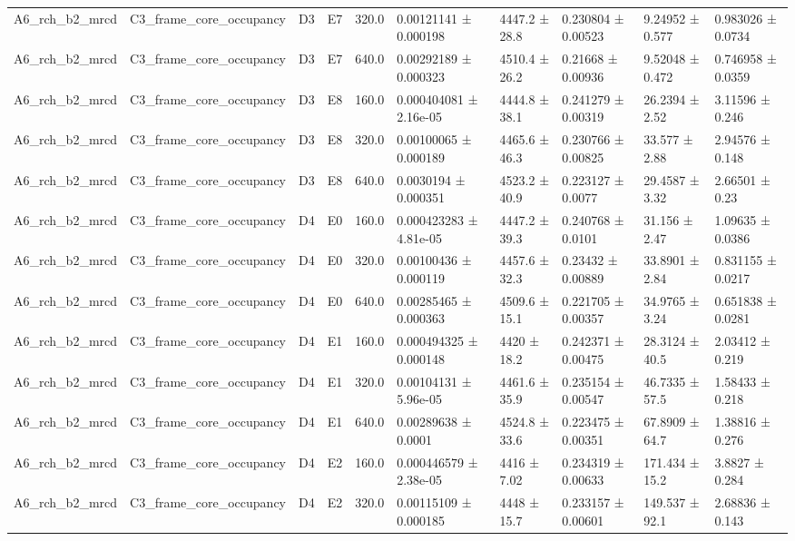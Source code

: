 \begin{table}
\begin{tabular}{llllllllll}
A6\_rch\_b2\_mrcd & C3\_frame\_core\_occupancy & D3 & E7 & 320.0 & 0.00121141 ± 0.000198 & 4447.2 ± 28.8 & 0.230804 ± 0.00523 & 9.24952 ± 0.577 & 0.983026 ± 0.0734 \\
A6\_rch\_b2\_mrcd & C3\_frame\_core\_occupancy & D3 & E7 & 640.0 & 0.00292189 ± 0.000323 & 4510.4 ± 26.2 & 0.21668 ± 0.00936 & 9.52048 ± 0.472 & 0.746958 ± 0.0359 \\
A6\_rch\_b2\_mrcd & C3\_frame\_core\_occupancy & D3 & E8 & 160.0 & 0.000404081 ± 2.16e-05 & 4444.8 ± 38.1 & 0.241279 ± 0.00319 & 26.2394 ± 2.52 & 3.11596 ± 0.246 \\
A6\_rch\_b2\_mrcd & C3\_frame\_core\_occupancy & D3 & E8 & 320.0 & 0.00100065 ± 0.000189 & 4465.6 ± 46.3 & 0.230766 ± 0.00825 & 33.577 ± 2.88 & 2.94576 ± 0.148 \\
A6\_rch\_b2\_mrcd & C3\_frame\_core\_occupancy & D3 & E8 & 640.0 & 0.0030194 ± 0.000351 & 4523.2 ± 40.9 & 0.223127 ± 0.0077 & 29.4587 ± 3.32 & 2.66501 ± 0.23 \\
A6\_rch\_b2\_mrcd & C3\_frame\_core\_occupancy & D4 & E0 & 160.0 & 0.000423283 ± 4.81e-05 & 4447.2 ± 39.3 & 0.240768 ± 0.0101 & 31.156 ± 2.47 & 1.09635 ± 0.0386 \\
A6\_rch\_b2\_mrcd & C3\_frame\_core\_occupancy & D4 & E0 & 320.0 & 0.00100436 ± 0.000119 & 4457.6 ± 32.3 & 0.23432 ± 0.00889 & 33.8901 ± 2.84 & 0.831155 ± 0.0217 \\
A6\_rch\_b2\_mrcd & C3\_frame\_core\_occupancy & D4 & E0 & 640.0 & 0.00285465 ± 0.000363 & 4509.6 ± 15.1 & 0.221705 ± 0.00357 & 34.9765 ± 3.24 & 0.651838 ± 0.0281 \\
A6\_rch\_b2\_mrcd & C3\_frame\_core\_occupancy & D4 & E1 & 160.0 & 0.000494325 ± 0.000148 & 4420 ± 18.2 & 0.242371 ± 0.00475 & 28.3124 ± 40.5 & 2.03412 ± 0.219 \\
A6\_rch\_b2\_mrcd & C3\_frame\_core\_occupancy & D4 & E1 & 320.0 & 0.00104131 ± 5.96e-05 & 4461.6 ± 35.9 & 0.235154 ± 0.00547 & 46.7335 ± 57.5 & 1.58433 ± 0.218 \\
A6\_rch\_b2\_mrcd & C3\_frame\_core\_occupancy & D4 & E1 & 640.0 & 0.00289638 ± 0.0001 & 4524.8 ± 33.6 & 0.223475 ± 0.00351 & 67.8909 ± 64.7 & 1.38816 ± 0.276 \\
A6\_rch\_b2\_mrcd & C3\_frame\_core\_occupancy & D4 & E2 & 160.0 & 0.000446579 ± 2.38e-05 & 4416 ± 7.02 & 0.234319 ± 0.00633 & 171.434 ± 15.2 & 3.8827 ± 0.284 \\
A6\_rch\_b2\_mrcd & C3\_frame\_core\_occupancy & D4 & E2 & 320.0 & 0.00115109 ± 0.000185 & 4448 ± 15.7 & 0.233157 ± 0.00601 & 149.537 ± 92.1 & 2.68836 ± 0.143 \\

\end{tabular}
\end{table}
